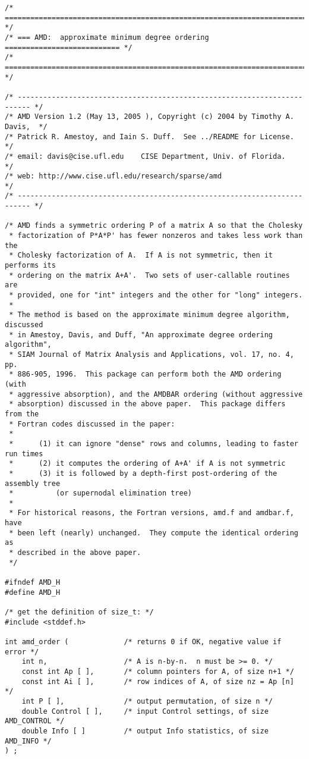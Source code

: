 \documentclass[11pt]{article}
\begin{document}
{\footnotesize
\begin{verbatim}
/* ========================================================================= */
/* === AMD:  approximate minimum degree ordering =========================== */
/* ========================================================================= */

/* ------------------------------------------------------------------------- */
/* AMD Version 1.2 (May 13, 2005 ), Copyright (c) 2004 by Timothy A. Davis,  */
/* Patrick R. Amestoy, and Iain S. Duff.  See ../README for License.         */
/* email: davis@cise.ufl.edu    CISE Department, Univ. of Florida.           */
/* web: http://www.cise.ufl.edu/research/sparse/amd                          */
/* ------------------------------------------------------------------------- */

/* AMD finds a symmetric ordering P of a matrix A so that the Cholesky
 * factorization of P*A*P' has fewer nonzeros and takes less work than the
 * Cholesky factorization of A.  If A is not symmetric, then it performs its
 * ordering on the matrix A+A'.  Two sets of user-callable routines are
 * provided, one for "int" integers and the other for "long" integers.
 *
 * The method is based on the approximate minimum degree algorithm, discussed
 * in Amestoy, Davis, and Duff, "An approximate degree ordering algorithm",
 * SIAM Journal of Matrix Analysis and Applications, vol. 17, no. 4, pp.
 * 886-905, 1996.  This package can perform both the AMD ordering (with
 * aggressive absorption), and the AMDBAR ordering (without aggressive
 * absorption) discussed in the above paper.  This package differs from the
 * Fortran codes discussed in the paper:
 *
 *      (1) it can ignore "dense" rows and columns, leading to faster run times
 *      (2) it computes the ordering of A+A' if A is not symmetric
 *      (3) it is followed by a depth-first post-ordering of the assembly tree
 *          (or supernodal elimination tree)
 *
 * For historical reasons, the Fortran versions, amd.f and amdbar.f, have
 * been left (nearly) unchanged.  They compute the identical ordering as
 * described in the above paper.
 */

#ifndef AMD_H
#define AMD_H

/* get the definition of size_t: */
#include <stddef.h>

int amd_order (             /* returns 0 if OK, negative value if error */
    int n,                  /* A is n-by-n.  n must be >= 0. */
    const int Ap [ ],       /* column pointers for A, of size n+1 */
    const int Ai [ ],       /* row indices of A, of size nz = Ap [n] */
    int P [ ],              /* output permutation, of size n */
    double Control [ ],     /* input Control settings, of size AMD_CONTROL */
    double Info [ ]         /* output Info statistics, of size AMD_INFO */
) ;


\end{verbatim}}
\end{document}
